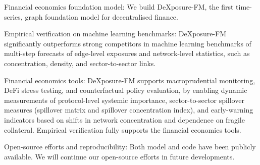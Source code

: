 \documentclass[preprint,12pt]{elsarticle}
\begin{document}
\begin{frontmatter}
\begin{abstract}
\end{abstract}


\begin{highlights}
\item Financial economics foundation model: We build DeXposure-FM, the first time-series, graph foundation model for decentralised finance.

\item Empirical verification on machine learning benchmarks: DeXposure-FM significantly outperforms strong competitors in machine learning benchmarks of multi-step forecasts of edge-level exposures and network-level statistics, such as concentration, density, and sector-to-sector links.

\item Financial economics tools: DeXposure-FM supports macroprudential monitoring, DeFi stress testing, and counterfactual policy evaluation, by enabling dynamic measurements of protocol-level systemic importance, sector-to-sector spillover measures (spillover matrix and spillover concentration index), and early-warning indicators based on shifts in network concentration and dependence on fragile collateral. Empirical verification fully supports the financial economics tools.

\item Open-source efforts and reproducibility: Both model and code have been publicly available. We will continue our open-source efforts in future developments.


\end{highlights}


\end{frontmatter}
\end{document}
